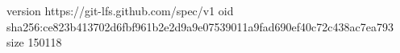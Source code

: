 version https://git-lfs.github.com/spec/v1
oid sha256:ce823b413702d6fbf961b2e2d9a9e07539011a9fad690ef40c72c438ac7ea793
size 150118
